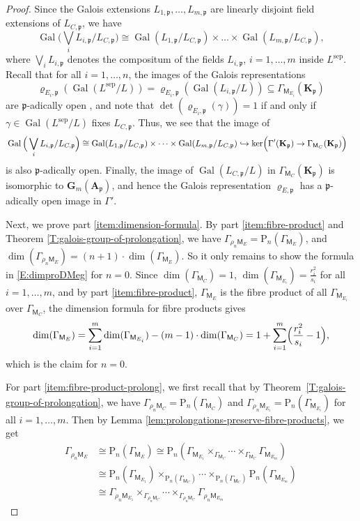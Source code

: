 \documentclass[10pt,a4paper]{amsart}
\theoremstyle{plain} %
\theoremstyle{definition}
\theoremstyle{remark}
\newcommand{\fp}{\mathfrak{p}}  %
\newcommand{\bA}{\mathbf{A}}
\newcommand{\bK}{\mathbf{K}}
\newcommand{\rP}[1]{\mathrm{P}_{\!#1}}
\newcommand{\Gal}{\operatorname{Gal}}
\newcommand{\Gm}{\textbf{G}_{m}}
\newcommand{\mot}{\mathsf{M}}  %
\newcommand{\sep}{\mathrm{sep}}
\numberwithin{equation}{subsection}
\begin{document}
\begin{proof}
Since the Galois extensions $L_{1,\fp},\ldots, L_{m,\fp}$ are linearly disjoint field extensions of $L_{C,\fp}$, we have 
\[  \Gal\Big(\bigvee_{i} L_{i,\fp}/ L_{C,\fp}\Big) \cong \Gal(L_{1,\fp}/L_{C,\fp})\times \dots \times \Gal(L_{m,\fp}/L_{C,\fp}), \]
where $\bigvee_{i} L_{i,\fp}$ denotes the compositum of the fields $L_{i, \fp}$, $i=1, \dots, m$ inside $L^{\sep}$.
Recall that for all $i=1, \dots, n$, the images of the Galois representations 
\[ \varrho_{E_i,\fp}(\Gal(L^\sep/L))=\varrho_{E_i,\fp}(\Gal(L_{i,\fp}/L))\subseteq \Gamma_{\mot_{E_i}}(\bK_\fp)\]
are $\fp$-adically open \cite[Thm.~0.2]{rp:mtcdm}, and note that $\det(\varrho_{E_i,\fp}(\gamma))=1$ if and only if $\gamma\in \Gal(L^\sep/L)$ fixes $L_{C,\fp}$. 
Thus, we see that the image of 
\begin{align*}
    &\Gal\Big(\bigvee_{i} L_{i,\fp}/ L_{C,\fp}\Big) \cong \Gal(L_{1,\fp}/L_{C,\fp})\times \dots \times \Gal(L_{m,\fp}/L_{C,\fp})
    \hookrightarrow \ker\Bigl(\Gamma'(\bK_{\fp})\to \Gamma_{\mot_C}(\bK_{\fp})\Bigr)
\end{align*} 
is also $\fp$-adically open. Finally, the image of $\Gal(L_{C,\fp}/L)$ in $\Gamma_{\mot_C}(\bK_{\fp})$ is  isomorphic to $\Gm(\bA_\fp)$, and hence the  Galois representation $\varrho_{E,\fp}$ has a $\fp$-adically open image in $\Gamma'$.


\medskip

Next, we prove part \eqref{item:dimension-formula}. By part \eqref{item:fibre-product} and Theorem \ref{T:galois-group-of-prolongation}, we have $\Gamma_{\rho_{n}\mot_E}=\rP{n}(\Gamma_{\mot_E})$, and
$\dim(\Gamma_{\rho_{n}\mot_E})=(n+1)\cdot \dim(\Gamma_{\mot_E})$. So it only remains to show the formula in \eqref{E:dimproDMeg} for $n=0$.
Since $\dim(\Gamma_{\mot_C})=1$, $\dim(\Gamma_{\mot_{E_i}})=\frac{r_i^2}{s_i}$ for all $i=1,\ldots, m$, and  by part \eqref{item:fibre-product}, $\Gamma_{\mot_E}$ is the fibre product of all $\Gamma_{\mot_{E_i}}$ over $\Gamma_{\mot_{C}}$, the dimension formula for fibre products gives
\[ \dim(\Gamma_{\mot_E})=\sum_{i=1}^m \dim(\Gamma_{\mot_{E_i}}) - (m-1)\cdot \dim(\Gamma_{\mot_C}) =  1 + \sum_{i=1}^m \Bigl(\frac{r_i^2}{s_i} -1 \Bigr) , \]
which is the claim for $n=0$.


For part \eqref{item:fibre-product-prolong}, we first recall that by Theorem~\ref{T:galois-group-of-prolongation}, we have  $\Gamma_{\rho_{n}\mot_C}=\rP{n}(\Gamma_{\mot_C})$ and $\Gamma_{\rho_{n}\mot_{E_i}}=\rP{n}(\Gamma_{\mot_{E_i}})$ for all $i=1,\ldots, m$.
Then by Lemma \ref{lem:prolongations-preserve-fibre-products}, we get
\begin{align*}
    \Gamma_{\rho_{n}\mot_E} &\cong 
    \rP{n}(\Gamma_{\mot_E}) \cong \rP{n}(\Gamma_{\mot_{E_1}}\times_{\Gamma_{\mot_C}}\cdots \times_{\Gamma_{\mot_C}} \Gamma_{\mot_{E_m}} ) \\
    & \cong \rP{n}(\Gamma_{\mot_{E_1}})\times_{\rP{n}(\Gamma_{\mot_C})} \cdots \times_{\rP{n}(\Gamma_{\mot_C})} \rP{n}(\Gamma_{\mot_{E_m}})\\ & \cong \Gamma_{\rho_{n}\mot_{E_1}}\times_{\Gamma_{\rho_{n}\mot_C}}\cdots \times_{\Gamma_{\rho_{n}\mot_C}} \Gamma_{\rho_{n}\mot_{E_m}} 
\end{align*}  
\end{proof}
\end{document}
